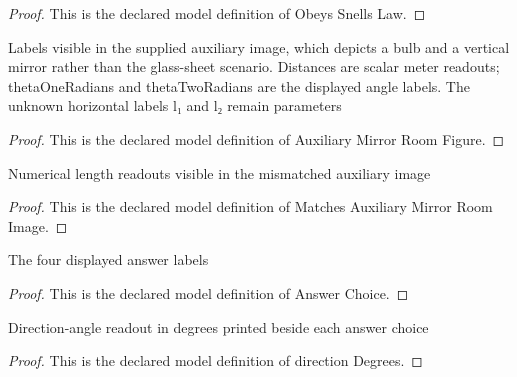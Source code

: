 \begin{proof}
  This is the declared model definition of Obeys Snells Law.
\end{proof}
\begin{definition}
  \label{def:physics:phyx-mini-0049:phyxminiproblems-problemphyxmini0049-auxiliarymirrorroomfigure}
  Labels visible in the supplied auxiliary image, which depicts a bulb and a vertical mirror rather than the glass-sheet scenario. Distances are scalar meter readouts; thetaOneRadians and thetaTwoRadians are the displayed angle labels. The unknown horizontal labels l₁ and l₂ remain parameters
\end{definition}
\begin{proof}
  This is the declared model definition of Auxiliary Mirror Room Figure.
\end{proof}
\begin{definition}
  \label{def:physics:phyx-mini-0049:phyxminiproblems-problemphyxmini0049-matchesauxiliarymirrorroomimage}
  Numerical length readouts visible in the mismatched auxiliary image
\end{definition}
\begin{proof}
  This is the declared model definition of Matches Auxiliary Mirror Room Image.
\end{proof}
\begin{definition}
  \label{def:physics:phyx-mini-0049:phyxminiproblems-problemphyxmini0049-answerchoice}
  The four displayed answer labels
\end{definition}
\begin{proof}
  This is the declared model definition of Answer Choice.
\end{proof}
\begin{definition}
  \label{def:physics:phyx-mini-0049:phyxminiproblems-problemphyxmini0049-answerchoice-directiondegrees}
  Direction-angle readout in degrees printed beside each answer choice
\end{definition}
\begin{proof}
  This is the declared model definition of direction Degrees.
\end{proof}
